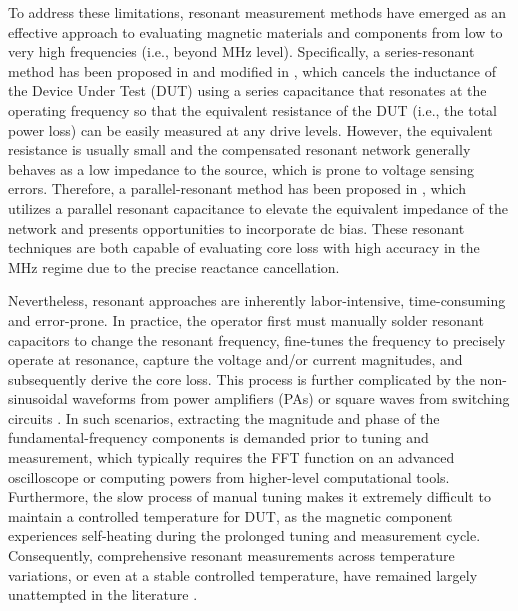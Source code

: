 \documentclass[conference]{IEEEtran}
\begin{document}
To address these limitations, resonant measurement methods have emerged as an effective approach to evaluating magnetic materials and components from low to very high frequencies (i.e., beyond MHz level). Specifically, a series-resonant method has been proposed in \cite{yhan} and modified in \cite{mmu}, which cancels the inductance of the Device Under Test (DUT) using a series capacitance that resonates at the operating frequency so that the equivalent resistance of the DUT (i.e., the total power loss) can be easily measured at any drive levels. However, the equivalent resistance is usually small and the compensated resonant network generally behaves as a low impedance to the source, which is prone to voltage sensing errors. Therefore, a parallel-resonant method has been proposed in \cite{abrown}, which utilizes a parallel resonant capacitance to elevate the equivalent impedance of the network and presents opportunities to incorporate dc bias. These resonant techniques are both capable of evaluating core loss with high accuracy in the MHz regime due to the precise reactance cancellation.

Nevertheless, resonant approaches are inherently labor-intensive, time-consuming and error-prone. In practice, the operator first must manually solder resonant capacitors to change the resonant frequency, fine-tunes the frequency to precisely operate at resonance, capture the voltage and/or current magnitudes, and subsequently derive the core loss. This process is further complicated by the non-sinusoidal waveforms from power amplifiers (PAs) \cite{abrown} or square waves from switching circuits \cite{janderson_classd}. In such scenarios, extracting the magnitude and phase of the fundamental-frequency components is demanded prior to tuning and measurement, which typically requires the FFT function on an advanced oscilloscope or computing powers from higher-level computational tools. Furthermore, the slow process of manual tuning makes it extremely difficult to maintain a controlled temperature for DUT, as the magnetic component experiences self-heating during the prolonged tuning and measurement cycle. Consequently, comprehensive resonant measurements across temperature variations, or even at a stable controlled temperature, have remained largely unattempted in the literature \cite{nkirkby}.
\end{document}
